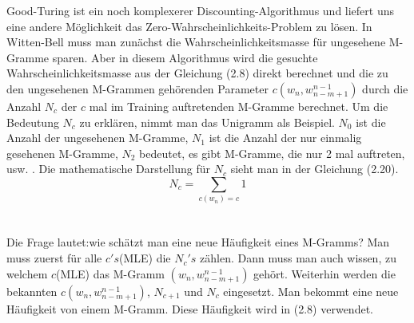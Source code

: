 Good-Turing ist ein noch komplexerer Discounting-Algorithmus und liefert uns eine andere M\"oglichkeit  das Zero-Wahrscheinlichkeits-Problem zu l\"osen. In Witten-Bell muss man zun\"achst die Wahrscheinlichkeitsmasse f\"ur ungesehene M-Gramme sparen. Aber in diesem Algorithmus wird die gesuchte Wahrscheinlichkeitsmasse aus der Gleichung (2.8) direkt berechnet und die zu den ungesehenen M-Grammen geh\"orenden Parameter $c(w_{n},w_{n-m+1}^{n-1})$ durch die Anzahl $N_{c}$ der  $c$ mal im Training auftretenden M-Gramme berechnet. Um die Bedeutung $N_{c}$ zu erkl\"aren, nimmt man das Unigramm als Beispiel. $N_{0}$ ist die Anzahl der ungesehenen M-Gramme, $N_{1}$ ist die Anzahl der nur einmalig gesehenen M-Gramme, $N_{2}$ bedeutet, es gibt  M-Gramme, die nur 2 mal auftreten, usw. . Die mathematische Darstellung f\"ur $N_{c}$ sieht man in der Gleichung (2.20).
\begin{equation}
N_{c}=\sum_{c(w_{n})=c}1
\end{equation}
\\
\\
Die Frage lautet:wie sch\"atzt man eine neue H\"aufigkeit eines M-Gramms? Man muss zuerst f\"ur alle $c's$(MLE) die $N_{c}'s$ z\"ahlen. Dann muss man auch wissen, zu welchem $c$(MLE) das M-Gramm $(w_{n},w_{n-m+1}^{n-1})$  geh\"ort. Weiterhin werden die bekannten $c(w_{n},w_{n-m+1}^{n-1})$, $N_{c+1}$ und $N_{c}$ eingesetzt. Man bekommt eine neue H\"aufigkeit von einem M-Gramm. Diese H\"aufigkeit wird in (2.8) verwendet.


